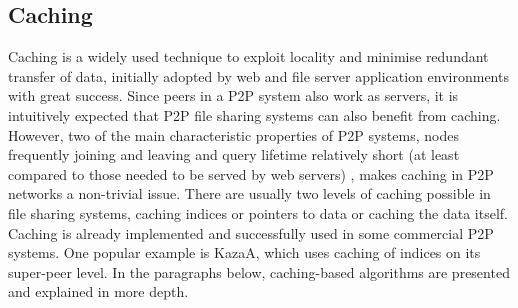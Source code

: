 


\subsection{Caching}

%
%
Caching is a widely used technique to exploit locality and minimise redundant
transfer of data, initially adopted by web and file server application
environments with great success. Since peers in a P2P system also work as
servers, it is intuitively expected that P2P file sharing systems can also
benefit from caching. However, two of the main characteristic properties of P2P
systems, nodes frequently joining and leaving and query lifetime relatively
short (at least compared to those needed to be served by web servers) , makes
caching in P2P networks a non-trivial issue. There are usually two levels of
caching possible in file sharing systems, caching indices or pointers to data or
caching the data itself. Caching is already implemented and successfully used in
some commercial P2P systems. One popular example is KazaA, which uses caching of
indices on its super-peer level. In the paragraphs below, caching-based
algorithms are presented and explained in more depth.


